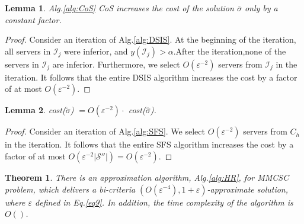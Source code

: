 \documentclass[journal]{IEEEtran}
\newtheorem{lemma}{Lemma}
\newtheorem{theorem}{Theorem}
\begin{document}
\begin{lemma} \label{lemma:CoS}
	Alg.\ref{alg:CoS} CoS increases the cost of the solution $\overline\sigma$ only by a constant factor.
\end{lemma}

\begin{proof}
	Consider an iteration of Alg.\ref{alg:DSIS}. At the beginning of the iteration, all servers in $\mathcal{I}_j$ were inferior, and $y(\mathcal{I}_j) > \alpha$.After the iteration,none of the servers in $\mathcal{I}_j$ are inferior. Furthermore, we select $O(\varepsilon^{-2})$ servers from $\mathcal{I}_j$ in the iteration. It follows that the entire DSIS algorithm increases the cost by a factor of at most $O(\varepsilon^{-2})$.
\end{proof}

\begin{lemma} \label{lemma:SFS}
	cost($\widetilde \sigma$) $= O(\varepsilon^{-2}) \cdot$ cost($\widehat{\sigma}$).
\end{lemma}

\begin{proof}
	Consider an iteration of Alg.\ref{alg:SFS}. We select $O(\varepsilon^{-2})$ servers from $C_h$ in the iteration. It follows that the entire SFS algorithm increases the cost by a factor of at most $O(\varepsilon^{-2}|\mathcal{S}''|)=O(\varepsilon^{-2})$.
\end{proof}


\begin{theorem}
	There is an approximation algorithm, Alg.\ref{alg:HR}, for MMCSC problem, which delivers a bi-criteria $(O(\varepsilon^{-4}), 1+\varepsilon)$-approximate solution, where $\varepsilon$ defined in Eq.\ref{eq9}. In addition, the time complexity of the algorithm is $O()$.
\end{theorem}
\end{document}
